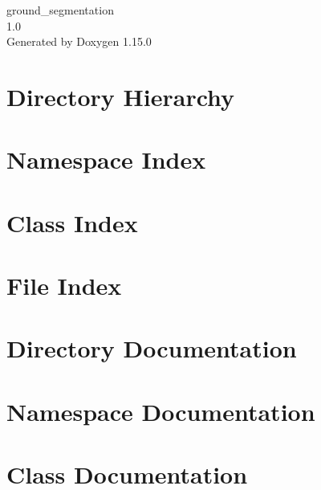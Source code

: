 \documentclass[twoside]{book}
\newcommand{\+}{\discretionary{\mbox{\scriptsize$\hookleftarrow$}}{}{}}
\newcommand{\clearemptydoublepage}{%
    \newpage{\pagestyle{empty}\cleardoublepage}%
  }
\begin{document}
  \raggedbottom
    \hypersetup{pageanchor=false,
                bookmarksnumbered=true,
                pdfencoding=unicode
               }
  \begin{titlepage}
  \vspace*{7cm}
  \begin{center}%
  {\Large ground\+\_\+segmentation}\\
  [1ex]\large 1.\+0 \\
  \vspace*{1cm}
  {\large Generated by Doxygen 1.15.0}\\
  \end{center}
  \end{titlepage}
  \clearemptydoublepage
  \tableofcontents
  \clearemptydoublepage
  \hypersetup{pageanchor=true}


\chapter{Directory Hierarchy}

\chapter{Namespace Index}

\chapter{Class Index}

\chapter{File Index}

\chapter{Directory Documentation}

\chapter{Namespace Documentation}

\chapter{Class Documentation}








\end{document}
